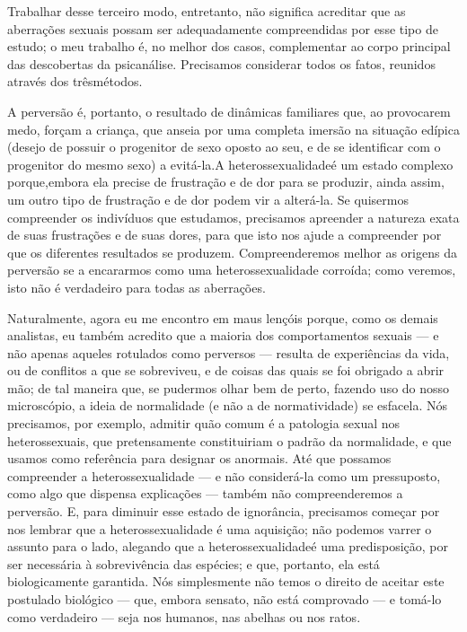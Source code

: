 Trabalhar desse terceiro modo, entretanto, não significa acreditar
que as aberrações sexuais possam ser adequadamente compreendidas por
esse tipo de estudo; o meu trabalho é, no melhor dos casos,
complementar ao corpo principal das descobertas da psicanálise.
Precisamos considerar todos os fatos, reunidos através dos três\idxpsica[|)]
métodos.

A perversão é, portanto, o resultado de dinâmicas familiares que, ao
provocarem medo, forçam a criança, que anseia por uma completa imersão
na situação edípica\idxconfe{} (desejo de possuir o progenitor de sexo oposto ao
seu, e de se identificar com o progenitor do mesmo sexo) a evitá-la.\idxinflu[|)] A
heterossexualidade\idxhetero[|(] é um estado complexo porque,\idxangu[|(] embora ela precise de
frustração e de dor para se produzir, ainda assim, um outro tipo de
frustração e de dor podem vir a alterá-la.\idxheteroadqu{} Se quisermos compreender os
indivíduos que estudamos, precisamos apreender a natureza exata de suas
frustrações e de suas dores, para que isto nos ajude a compreender por
que os diferentes resultados se produzem. Compreenderemos melhor as
origens da perversão se a encararmos como uma heterossexualidade
corroída; como veremos, isto não é verdadeiro para todas as aberrações.

Naturalmente, agora eu me encontro em maus lençóis porque, como os
demais analistas, eu também acredito que a maioria dos comportamentos
sexuais --- e não apenas aqueles rotulados como perversos --- resulta de
experiências da vida, ou de conflitos a que se sobreviveu, e de coisas
das quais se foi obrigado a abrir mão; de tal maneira que, se pudermos
olhar bem de perto, fazendo uso do nosso microscópio, a ideia de
normalidade\idxnorma{} (e não a de normatividade)\idxpervnorma{} se esfacela. Nós precisamos, por
exemplo, admitir quão comum é a patologia sexual nos heterossexuais,
que pretensamente constituiriam o padrão da normalidade, e que usamos
como referência para designar os anormais. Até que possamos
compreender a heterossexualidade --- e não considerá-la como um
pressuposto, como algo que dispensa explicações --- também não
compreenderemos a perversão. E, para diminuir esse estado de
ignorância, precisamos começar por nos lembrar que a heterossexualidade
é uma aquisição; não podemos varrer o assunto para o lado, alegando que
a heterossexualidade\idxhetero[|)] é uma predisposição, por ser necessária à
sobrevivência das espécies; e que, portanto, ela está \mbox{biologicamente}
garantida. Nós simplesmente não temos o direito de aceitar este
postulado biológico --- que, embora sensato, não está comprovado --- e
tomá-lo como verdadeiro --- seja nos humanos, nas abelhas ou nos ratos.

